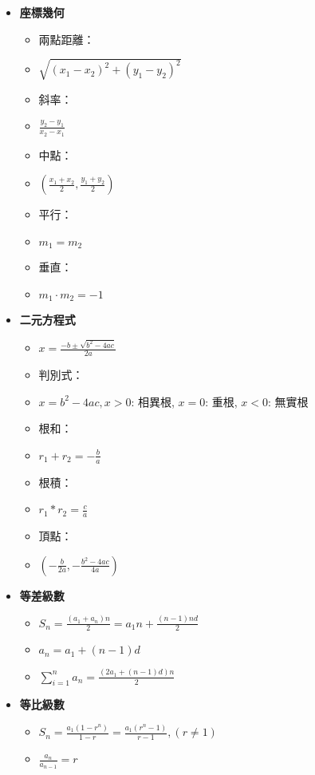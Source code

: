 \begin{itemize}
  \item \textbf{座標幾何}
  \begin{itemize}
    \item 兩點距離：
    \item $\sqrt{(x_1-x_2)^2+(y_1-y_2)^2}$
    \item 斜率：
    \item $\frac{y_2-y_1}{x_2-x_1}$
    \item 中點：
    \item $\left(\frac{x_1+x_2}{2}, \frac{y_1+y_2}{2}\right)$
    \item 平行：
    \item $m_1 = m_2$
    \item 垂直：
    \item $m_1 \cdot m_2 = -1$
  \end{itemize}

  \item \textbf{二元方程式}
  \begin{itemize}
    \item $x = \frac{-b \pm \sqrt{b^2-4ac}}{2a}$
    \item 判別式：
    \item $x = b^2-4ac, x>0$: 相異根, $x=0$: 重根, $x<0$: 無實根
    \item 根和：
    \item $r_1+r_2 = -\frac{b}{a}$
    \item 根積：
    \item $r_1*r_2 = \frac{c}{a}$
    \item 頂點：
    \item $(-\frac{b}{2a}, -\frac{b^2-4ac}{4a})$
  \end{itemize}
  
  \item \textbf{等差級數}
  \begin{itemize}
    \item $S_n = \frac{(a_1 + a_n)n}{2} = a_1n + \frac{(n-1)nd}{2}$
    \item $a_n = a_1 + (n-1)d$
    \item $\sum \limits_{i=1}^n a_n = \frac{(2a_1+(n-1)d)n}{2}$
  \end{itemize}
  
  \item \textbf{等比級數}
  \begin{itemize}
    \item $S_n = \frac{a_1(1-r^n)}{1-r} = \frac{a_1(r^n-1)}{r-1}, (r \neq 1)$
    \item $\frac{a_n}{a_{n-1}} = r$
  \end{itemize}


\end{itemize}
